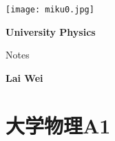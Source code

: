 \documentclass[
	12pt, %
	fleqn, %
	a4paper, %
]{myLegrandOrangeBook}
\begin{document}

\titlepage %
	{\texttt{[image: miku0.jpg]}} %
	{ %
		\centering\sffamily %
		{\Huge\bfseries University Physics\par} %
		\vspace{16pt} %
		{\LARGE Notes\par} %
		\vspace{24pt} %
		{\huge\bfseries Lai Wei\par} %
	}


\pagestyle{empty} %

\tableofcontents %

\pagestyle{fancy} %

\cleardoublepage %


\part{大学物理A1}


\chapterspaceabove{6.75cm} %
\chapterspacebelow{7.25cm} %
\end{document}
